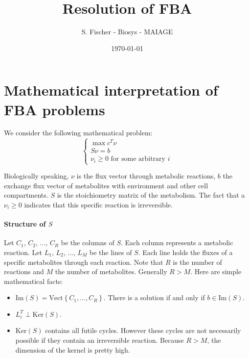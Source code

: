 \documentclass[12pt]{scrartcl}
\theoremstyle{definition}
\theoremstyle{remark}
\numberwithin{equation}{section}
\newcommand{\Ker}[1]{\mathrm{Ker}\left(#1\right)}
\newcommand{\Image}[1]{\mathrm{Im}\left(#1\right)}
\newcommand{\Vect}[1]{\mathrm{Vect}\left\{#1\right\}}
\begin{document}
\title{Resolution of FBA}%
\author{S. Fischer - Biosys - MAIAGE}%
\date{\today}%

\maketitle

\newpage

\tableofcontents

\newpage

\section{Mathematical interpretation of FBA problems}

We consider the following mathematical problem:
\[
\left\lbrace
\begin{array}{l}
  \max c^T\nu \\
  S\nu = b \\
  \nu_i \geq 0 \textrm{ for some arbitrary $i$}
\end{array}
\right.
\]

Biologically speaking, $\nu$ is the flux vector through metabolic reactions, $b$ the exchange flux vector of metabolites with environment and other cell compartments. $S$ is the stoichiometry matrix of the metabolism. The fact that a $\nu_i\geq 0$ indicates that this specific reaction is irreversible.

\paragraph{Structure of $S$} Let $C_1$, $C_2$, ..., $C_R$ be the columns of $S$. Each column represents a metabolic reaction. Let $L_1$, $L_2$, ..., $L_M$ be the lines of $S$. Each line holds the fluxes of a specific metabolites through each reaction. Note that $R$ is the number of reactions and $M$ the number of metabolites. Generally $R > M$. Here are simple mathematical facts:
\begin{itemize}
  \item $\Image{S}=\Vect{C_1, ..., C_R}$. There is a solution if and only if $b \in \Image{S}$.
  \item $L_i^T \perp \Ker{S}$.
  \item $\Ker{S}$ contains all futile cycles. However these cycles are not necessarily possible if they contain an irreversible reaction. Because $R > M$, the dimension of the kernel is pretty high.
\end{itemize}
\end{document}
